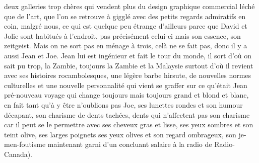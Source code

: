 deux galleries trop chères qui vendent plus du design graphique commercial
léché que de l'art, que l'on se retrouve à gigglé avec des petits regards
admiratifs en coin, malgré nous, ce qui est quelque peu étrange d'ailleurs
parce que David et Jolie sont habitués à l'endroit, pas précisément celui-ci
mais son essence, son zeitgeist. Mais on ne sort pas en ménage à trois, celà ne
se fait pas, donc il y a aussi Jean et Joe.  
Jean lui est ingénieur et fait le tour du monde, il sort d'où on sait pu trop,
la Zambie, toujours la Zambie et la Malaysie surtout d'où il revient avec ses
histoires rocambolesques, une légère barbe hirsute, de nouvelles normes
culturelles et une nouvelle personnalité qui vient se graffer sur ce qu'était
Jean pré-nouveau voyage qui change toujours mais toujours grand et blond et
blanc, en fait tant qu'à y être n'oublions pas Joe, ses lunettes rondes et son
humour décapant, son charisme de dents tachées, dents qui n'affectent pas son
charisme car il peut se le permettre avec ses cheveux gras et lisse, ses yeux
sombres et son teint olive, ses larges poignets ses yeux olives et son regard
ombrageux, son je-men-foutisme maintenant garni d'un concluant salaire à la
radio de Radio-Canada). \\


